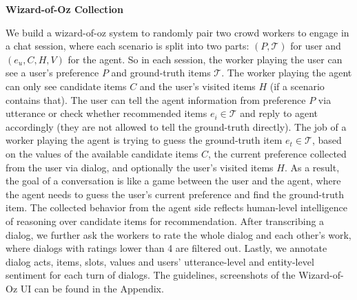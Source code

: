 \begin{table}
    \centering
    \caption{Statistics of MGConvRex Dataset}     
\label{chap6:tbl:dataset}
\end{table}

\textbf{Wizard-of-Oz Collection}
\label{chap6:sec:woz}

We build a wizard-of-oz system to randomly pair two crowd workers to engage in a chat session, where each scenario is split into two parts:
$(P, \mathcal{T})$ for user and $(e_u, C, H, V)$ for the agent.
So in each session, the worker playing the user can see a user's preference $P$ and ground-truth items $\mathcal{T}$. 
The worker playing the agent can only see candidate items $C$ and the user's visited items $H$ (if a scenario contains that).
The user can tell the agent information from preference $P$ via utterance or check whether recommended items $e_i \in \mathcal{T}$ and reply to agent accordingly (they are not allowed to tell the ground-truth directly). 
The job of a worker playing the agent is trying to guess the ground-truth item $e_t \in \mathcal{T}$, based on the values of the available candidate items $C$, the current preference collected from the user via dialog, and optionally the user's visited items $H$.
As a result, the goal of a conversation is like a game between the user and the agent, where the agent needs to guess the user's current preference and find the ground-truth item.
The collected behavior from the agent side reflects human-level intelligence of reasoning over candidate items for recommendation.
After transcribing a dialog, we further ask the workers to rate the whole dialog and each other's work, where
dialogs with ratings lower than 4 are filtered out.
Lastly, we annotate dialog acts, items, slots, values and users' utterance-level and entity-level sentiment for each turn of dialogs.
The guidelines, screenshots of the Wizard-of-Oz UI can be found in the Appendix.

